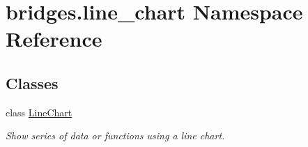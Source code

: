 \hypertarget{namespacebridges_1_1line__chart}{}\section{bridges.\+line\+\_\+chart Namespace Reference}
\label{namespacebridges_1_1line__chart}
\subsection*{Classes}
\begin{DoxyCompactItemize}
\item 
class \mbox{\hyperlink{classbridges_1_1line__chart_1_1_line_chart}{Line\+Chart}}
\begin{DoxyCompactList}\small\item\em Show series of data or functions using a line chart. \end{DoxyCompactList}\end{DoxyCompactItemize}
